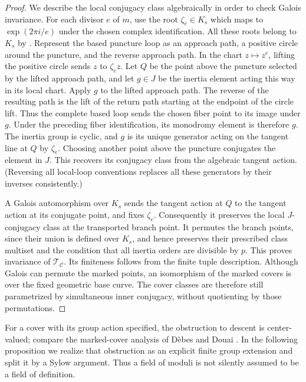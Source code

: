 \begin{proof}
We describe the local conjugacy class algebraically in order to check
Galois invariance.  For each divisor $e$ of $m$, use the root
$\zeta_e\in K_s$ which maps to $\exp(2\pi i/e)$ under the chosen
complex identification.  All these roots belong to $K_s$ by
.
Represent the based puncture loop as an approach path, a positive
circle around the puncture, and the reverse approach path.
In the chart $z\mapsto z^e$, lifting the positive circle sends $z$ to
$\zeta_e z$. Let $Q$ be the point above the puncture selected by the
lifted approach path, and let $g\in J$ be the inertia element acting
this way in its local chart. Apply $g$ to the lifted approach path.
The reverse of the resulting path is the lift of the return path
starting at the endpoint of the circle lift. Thus the complete based
loop sends the chosen fiber point to its image under $g$.
Under the preceding fiber identification, its monodromy element is
therefore $g$. The inertia group is cyclic, and $g$ is its unique
generator acting on the tangent line at $Q$ by $\zeta_e$.
Choosing another point above the puncture conjugates the element in $J$.
This recovers its conjugacy class from the algebraic tangent action.
(Reversing all local-loop conventions replaces all these generators by
their inverses consistently.)

A Galois automorphism over $K_s$ sends the tangent action at $Q$ to
the tangent action at its conjugate point, and fixes $\zeta_e$.
Consequently it preserves the local $J$-conjugacy class at the transported
branch point.  It permutes the branch points, since their union is
defined over $K_s$, and hence preserves their prescribed class multiset
and the condition that all inertia orders are divisible by $p$.
This proves invariance of $\mathcal T_{\mathcal C}$.
Its finiteness follows from the finite tuple description.
Although Galois can permute the marked points, an isomorphism of the
marked covers is over the fixed geometric base curve. The cover classes
are therefore still parametrized by simultaneous inner conjugacy,
without quotienting by those permutations.
\end{proof}

For a cover with its group action specified, the obstruction to descent
is center-valued; compare the marked-cover analysis of
D\`ebes and Douai \cite[Section~3.2]{DebesDouai1997}. In the following
proposition we realize that obstruction as an explicit finite group
extension and split it by a Sylow argument. Thus a field of moduli is
not silently assumed to be a field of definition.

